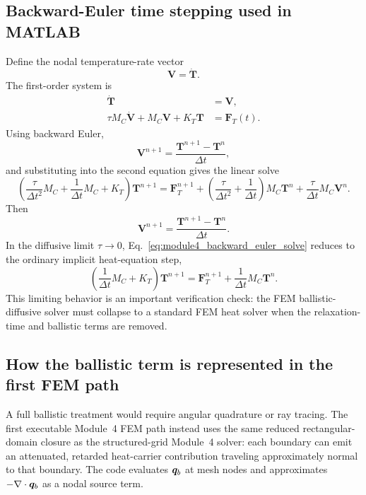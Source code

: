 \documentclass[11pt]{article}
\begin{document}
\subsection{Backward-Euler time stepping used in MATLAB}
Define the nodal temperature-rate vector
\begin{equation}
    \bm{V}=\dot{\bm{T}}.
\end{equation}
The first-order system is
\begin{align}
    \dot{\bm{T}} &= \bm{V},\\
    \tau M_C\dot{\bm{V}}+M_C\bm{V}+K_T\bm{T} &= \bm{F}_T(t).
\end{align}
Using backward Euler,
\begin{equation}
    \bm{V}^{n+1}=\frac{\bm{T}^{n+1}-\bm{T}^{n}}{\Delta t},
\end{equation}
and substituting into the second equation gives the linear solve
\begin{equation}
    \boxed{
    \left(\frac{\tau}{\Delta t^2}M_C+\frac{1}{\Delta t}M_C+K_T\right)\bm{T}^{n+1}
    =\bm{F}_T^{n+1}
    +\left(\frac{\tau}{\Delta t^2}+\frac{1}{\Delta t}\right)M_C\bm{T}^{n}
    +\frac{\tau}{\Delta t}M_C\bm{V}^{n}.}
    \label{eq:module4_backward_euler_solve}
\end{equation}
Then
\begin{equation}
    \bm{V}^{n+1}=\frac{\bm{T}^{n+1}-\bm{T}^n}{\Delta t}.
\end{equation}
In the diffusive limit \(\tau\to0\), Eq.~\eqref{eq:module4_backward_euler_solve} reduces to the ordinary implicit heat-equation step,
\begin{equation}
    \boxed{
    \left(\frac{1}{\Delta t}M_C+K_T\right)\bm{T}^{n+1}
    =\bm{F}_T^{n+1}+\frac{1}{\Delta t}M_C\bm{T}^{n}.}
    \label{eq:module4_backward_euler_fourier_limit}
\end{equation}
This limiting behavior is an important verification check: the FEM ballistic-diffusive solver must collapse to a standard FEM heat solver when the relaxation-time and ballistic terms are removed.

\subsection{How the ballistic term is represented in the first FEM path}
A full ballistic treatment would require angular quadrature or ray tracing. The first executable Module~4 FEM path instead uses the same reduced rectangular-domain closure as the structured-grid Module~4 solver: each boundary can emit an attenuated, retarded heat-carrier contribution traveling approximately normal to that boundary. The code evaluates \(\bm{q}_b\) at mesh nodes and approximates \(-\nabla\cdot\bm{q}_b\) as a nodal source term.
\end{document}
